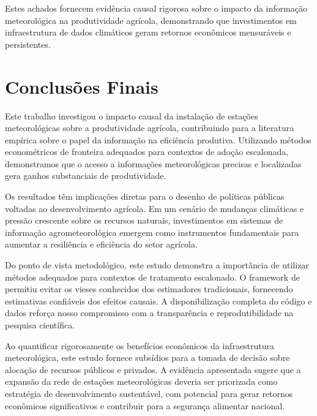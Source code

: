\documentclass[
	12pt,				%
	oneside,			%
	a4paper,			%
	english,			%
	french,				%
	spanish,			%
	brazil				%
	]{abntex2}
\begin{document}
Estes achados fornecem evidência causal rigorosa sobre o impacto da informação meteorológica na produtividade agrícola, demonstrando que investimentos em infraestrutura de dados climáticos geram retornos econômicos mensuráveis e persistentes.

\chapter{Conclusões Finais}

Este trabalho investigou o impacto causal da instalação de estações meteorológicas sobre a produtividade agrícola, contribuindo para a literatura empírica sobre o papel da informação na eficiência produtiva. Utilizando métodos econométricos de fronteira adequados para contextos de adoção escalonada, demonstramos que o acesso a informações meteorológicas precisas e localizadas gera ganhos substanciais de produtividade.

Os resultados têm implicações diretas para o desenho de políticas públicas voltadas ao desenvolvimento agrícola. Em um cenário de mudanças climáticas e pressão crescente sobre os recursos naturais, investimentos em sistemas de informação agrometeorológica emergem como instrumentos fundamentais para aumentar a resiliência e eficiência do setor agrícola.

Do ponto de vista metodológico, este estudo demonstra a importância de utilizar métodos adequados para contextos de tratamento escalonado. O framework de  permitiu evitar os vieses conhecidos dos estimadores tradicionais, fornecendo estimativas confiáveis dos efeitos causais. A disponibilização completa do código e dados reforça nosso compromisso com a transparência e reprodutibilidade na pesquisa científica.

Ao quantificar rigorosamente os benefícios econômicos da infraestrutura meteorológica, este estudo fornece subsídios para a tomada de decisão sobre alocação de recursos públicos e privados. A evidência apresentada sugere que a expansão da rede de estações meteorológicas deveria ser priorizada como estratégia de desenvolvimento sustentável, com potencial para gerar retornos econômicos significativos e contribuir para a segurança alimentar nacional.

\postextual
\end{document}
